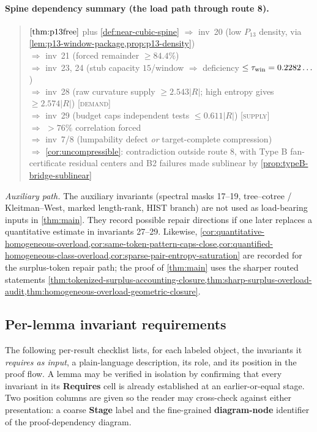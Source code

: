 \documentclass[11pt]{article}
\begin{document}
\paragraph{Spine dependency summary (the load path through route 8).}
\begin{quote}\small\raggedright
$\cref{thm:p13free}$ plus \cref{def:near-cubic-spine} $\Rightarrow$ inv~20 (low $P_{13}$ density, via \cref{lem:p13-window-package,prop:p13-density}) \\
$\Rightarrow$ inv~21 (forced remainder $\ge84.4\%$) \\
$\Rightarrow$ inv~23, 24 (stub capacity $15$/window $\Rightarrow$ deficiency $\le\tau_{\rm win}=0.2282\ldots$) \\
$\Rightarrow$ inv~28 (raw curvature supply $\ge2.543|R|$; high entropy gives $\ge2.574|R|$) \hfill [\textsc{demand}] \\
$\Rightarrow$ inv~29 (budget caps independent tests $\le0.611|R|$) \hfill [\textsc{supply}] \\
$\Rightarrow$ $>76\%$ correlation forced \\
$\Rightarrow$ inv~7/8 (lumpability defect \emph{or} target-complete compression) \\
$\Rightarrow$ \cref{cor:uncompressible}: contradiction outside route 8, with
Type B fan-certificate residual centers and B2 failures made sublinear by
\cref{prop:typeB-bridge-sublinear}
\end{quote}
\noindent\emph{Auxiliary path.}  The auxiliary invariants (spectral masks
17--19, tree--cotree / Kleitman--West, marked length-rank, HIST branch) are not
used as load-bearing inputs in \cref{thm:main}.  They record possible repair
directions if one later replaces a quantitative estimate in invariants 27--29.
Likewise,
\cref{cor:quantitative-homogeneous-overload,cor:same-token-pattern-caps-close,cor:quantified-homogeneous-class-overload,cor:sparse-pair-entropy-saturation}
are recorded for the surplus-token repair path; the proof of
\cref{thm:main} uses the sharper routed statements
\cref{thm:tokenized-surplus-accounting-closure,thm:sharp-surplus-overload-audit,thm:homogeneous-overload-geometric-closure}.

\subsection*{Per-lemma invariant requirements}

The following per-result checklist lists, for each labeled object, the invariants it \emph{requires as input}, a plain-language description, its role, and its position in the proof flow.  A lemma may be verified in isolation by confirming that every invariant in its \textbf{Requires} cell is already established at an earlier-or-equal stage.  Two position columns are given so the reader may cross-check against either presentation: a coarse \textbf{Stage} label and the fine-grained \textbf{diagram-node} identifier of the proof-dependency diagram.
\end{document}
